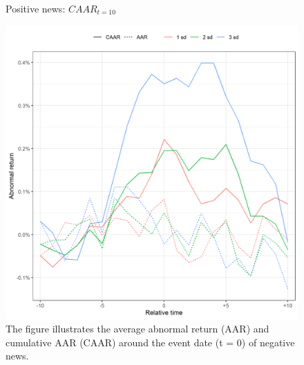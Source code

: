 \begin{figure} [H]
    \centering
    \caption{Positive news: $CAAR_{t=10}$}
    \includegraphics[scale=0.6]{Projekt/1.Figures analysis/ST_positive_sensitivity.png}
     \caption*{\footnotesize The figure illustrates the average abnormal return (AAR) and cumulative AAR (CAAR) around the event date (t = 0) of negative news. }
    \label{fig:ST_pos_sensi}
\end{figure} 
